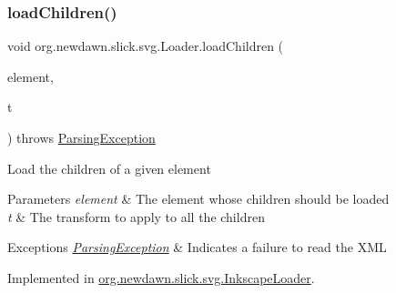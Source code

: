 \subsubsection{\texorpdfstring{load\+Children()}{loadChildren()}}
{\footnotesize\ttfamily void org.\+newdawn.\+slick.\+svg.\+Loader.\+load\+Children (\begin{DoxyParamCaption}\item[{Element}]{element,  }\item[{Transform}]{t }\end{DoxyParamCaption}) throws \mbox{\hyperlink{classorg_1_1newdawn_1_1slick_1_1svg_1_1_parsing_exception}{Parsing\+Exception}}}

Load the children of a given element


\begin{DoxyParams}{Parameters}
{\em element} & The element whose children should be loaded \\
\hline
{\em t} & The transform to apply to all the children \\
\hline
\end{DoxyParams}

\begin{DoxyExceptions}{Exceptions}
{\em \mbox{\hyperlink{classorg_1_1newdawn_1_1slick_1_1svg_1_1_parsing_exception}{Parsing\+Exception}}} & Indicates a failure to read the X\+ML \\
\hline
\end{DoxyExceptions}


Implemented in \mbox{\hyperlink{classorg_1_1newdawn_1_1slick_1_1svg_1_1_inkscape_loader_ac08d33005336e9ca1dedd9c092c35bcb}{org.\+newdawn.\+slick.\+svg.\+Inkscape\+Loader}}.

